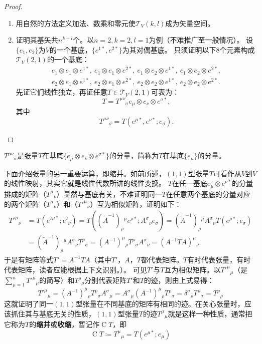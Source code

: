 \begin{proof}
\begin{enumerate}[（A）]
\item 用自然的方法定义加法、数乘和零元使$\mathscr{T}_V(k, l)$成为矢量空间。
\item 证明其基矢共$n^{k + l}$个。以$n = 2, k = 2, l = 1$为例（不难推广至一般情况）。
设$\{e_1, e_2\}$为$V$的一个基底，$\{e^{1*}, e^{2*}\}$为其对偶基底。
只须证明以下$8$个元素构成$\mathscr{T}_V(2, 1)$的一个基底：
$$\begin{aligned}
e_1 \otimes e_1 \otimes e^{1*}, ~ e_1 \otimes e_1 \otimes e^{2*}, ~ e_1 \otimes e_2 \otimes e^{1*}, ~ e_1 \otimes e_2 \otimes e^{2*}, \\
e_2 \otimes e_1 \otimes e^{1*}, ~ e_2 \otimes e_1 \otimes e^{2*}, ~ e_2 \otimes e_2 \otimes e^{1*}, ~ e_2 \otimes e_2 \otimes e^{2*}.
\end{aligned}$$
先证它们线性独立，再证任意$T \in \mathscr{T}_V(2, 1)$可表为：
$$T = T^{\mu\nu}{}_\sigma e_\mu \otimes e_\nu \otimes e^{\sigma*},$$
其中
$$T^{\mu\nu}{}_\sigma = T(e^{\mu*}, e^{\nu*}; e_\sigma).$$
\end{enumerate}
\end{proof}

\begin{note}
$T^{\mu\nu}{}_\sigma$是张量$T$在基底$\{e_\mu \otimes e_\nu \otimes e^{\sigma*}\}$的分量，简称为$T$在基底$\{e_\mu\}$的分量。
\end{note}

下面介绍张量的另一重要运算，即缩并。如前所述，$(1, 1)$型张量$T$可看作从$V$到$V$的线性映射，其实它就是线性代数所讲的线性变换。
$T$在任一基底${e_\mu \otimes e^{\nu*}}$的分量排成的矩阵（$T^\mu{}_\nu$）显然与基底有关，不难证明同一$T$在任意两个基底的分量对应的两个矩阵（$T^\mu{}_\nu$）和（$T'^\mu{}_\nu$）互为相似矩阵，证明如下：
$$\begin{aligned}
T'^\mu{}_\nu & = T(e'^{\mu*}; e'_\nu) = T((\tilde{A}^{-1})_\rho{}^\mu e^{\rho*};A^\sigma{}_\nu e_\sigma) = (\tilde{A}^{-1})_\rho{}^\mu A^\sigma{}_\nu T(e^{\rho*}; e_\sigma) \\
& = (\tilde{A}^{-1})_\rho{}^\mu A^\sigma{}_\nu T^\rho{}_\sigma = (A^{-1})^\mu{}_\rho T^\rho{}_\sigma A^\sigma{}_\nu = (A^{-1}TA)^\mu{}_\nu
\end{aligned}$$
于是有矩阵等式$T' = A^{-1}TA$（其中$T'$，$A$，$T$都代表矩阵。$T$有时代表张量，有时代表矩阵，读者应能根据上下文识别。）。
可见$T'$与$T$互为相似矩阵。以$T'^\mu{}_\mu$（是$\sum_{\mu = 1}^n T'^\mu{}_\mu$的简写）和$T^\rho{}_\rho$分别代表矩阵$T'$和$T$的迹，则由上式易得：
$$T'^\mu{}_\mu = (A^{-1})^\mu{}_\rho T^\rho{}_\sigma A^\sigma{}_\mu = A^\sigma{}_\mu(A^{-1})^\mu{}_\rho T^\rho{}_\sigma = \delta^\sigma{}_\rho T^\rho{}_\sigma = T^\rho{}_\rho$$
这就证明了同一$(1, 1)$型张量在不同基底的矩阵有相同的迹。在关心张量时，应该抓住其与基底无关的性质，$(1, 1)$型张量$T$的迹$T^\mu{}_\mu$就是这样一种性质，通常把它称为$T$的\textbf{缩并}或\textbf{收缩}，暂记作$\operatorname{C} T$，即
$$\operatorname{C} T \coloneq T^\mu{}_\mu = T(e^{\mu*}; e_\mu)$$


